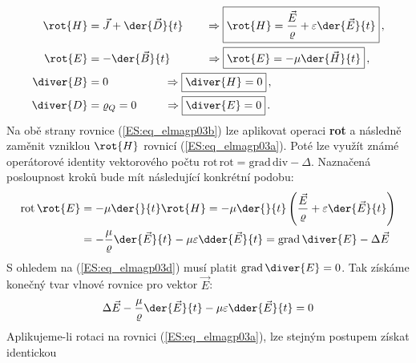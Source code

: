     \begin{subequations}
      \begin{align}
        \rot{H}   &= \vec{J} + \der{\vec{D}}{t} 
                     \qquad \Rightarrow \boxed{\rot{H} 
                       = \frac{\vec{E}}{\varrho} + 
                         \varepsilon\der{\vec{E}}{t}}\, ,    \label{ES:eq_elmagp03a} \\
        \rot{E}   &= - \der{\vec{B}}{t}
                     \qquad\quad\, \Rightarrow \boxed{\rot{E} 
                       = -\mu\der{\vec{H}}{t}}\, ,           \label{ES:eq_elmagp03b} \\
        \diver{B} &= 0 \qquad\qquad\quad \Rightarrow \boxed{\diver{H} 
                       = 0}\, ,                              \label{ES:eq_elmagp03c} \\
        \diver{D} &= \varrho_Q = 0 \quad\quad\,\,\, \Rightarrow \boxed{\diver{E}
                       = 0}\, .                              \label{ES:eq_elmagp03d}
      \end{align}
    \end{subequations}
    Na obě strany rovnice (\ref{ES:eq_elmagp03b}) lze aplikovat operaci \textbf{rot} a následně 
    zaměnit vzniklou \(\rot{H}\) rovnicí (\ref{ES:eq_elmagp03a}). Poté lze využít známé operátorové 
    identity vektorového počtu \(\text{rot}\,\text{rot} = \text{grad}\,\text{div} -\Delta\). 
    Naznačená posloupnost kroků bude mít následující konkrétní podobu:
    \begin{align}
     \text{rot}\,\rot{E} &= -\mu\der{}{t}\rot{H} 
                          = -\mu\der{}{t}
                             \left(
                               \frac{\vec{E}}{\varrho} +
                               \varepsilon\der{\vec{E}}{t}
                              \right)                            \nonumber  \\
                         &= - \frac{\mu}{\varrho}\der{\vec{E}}{t} - 
                              \mu\varepsilon\dder{\vec{E}}{t} 
                          = \text{grad}\,\diver{E} - \Delta\vec{E}  \label{ES:eq_elmagp04}
    \end{align}
    S ohledem na (\ref{ES:eq_elmagp03d}) musí platit \(\text{grad}\,\diver{E} = 0\). Tak získáme 
    konečný tvar vlnové rovnice pro vektor \(\vec{E}\):
    \begin{equation}\label{ES:eq_elmagp05}
      \Delta\vec{E} - \frac{\mu}{\varrho}\der{\vec{E}}{t} - \mu\varepsilon\dder{\vec{E}}{t} = 0
    \end{equation}
    Aplikujeme-li rotaci na rovnici (\ref{ES:eq_elmagp03a}), lze stejným postupem získat identickou 
